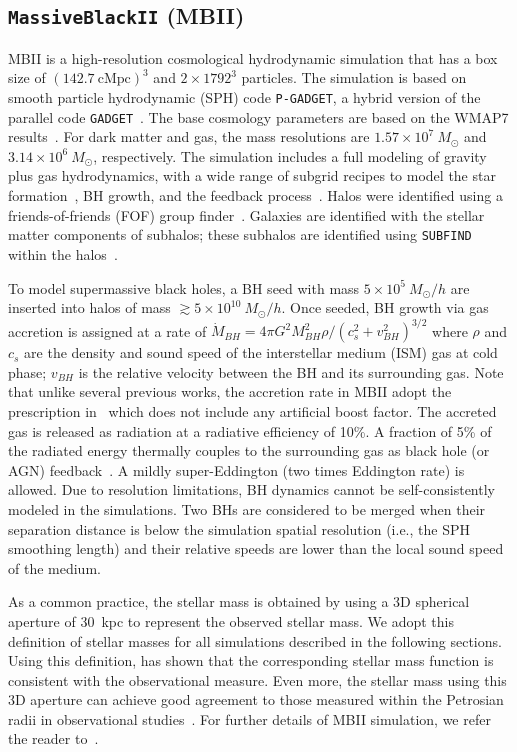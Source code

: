 \documentclass[twocolumn]{aastex631}
\begin{document}
\subsection{{\tt MassiveBlackII} (MBII)}\label{subsec:MBII}
MBII is a high-resolution cosmological hydrodynamic simulation that has a box size of $(142.7~\mathrm{cMpc})^3$
and $2\times1792^3$ particles. The simulation is based on smooth particle hydrodynamic (SPH) code \texttt{P-GADGET}, a hybrid version of the parallel code {\tt GADGET}~\citep{2005MNRAS.364.1105S}. The base cosmology parameters are based on the WMAP7 results~\citep{2011ApJS..192...18K}. For dark matter and gas, the mass resolutions are $1.57\times 10^7~M_{\odot}$ and $3.14\times 10^6~M_{\odot}$, respectively. The simulation includes a full modeling of gravity plus gas hydrodynamics, with a wide range of subgrid recipes to model the star formation~\citep{2003MNRAS.339..289S}, BH growth, and the feedback process~\citep{2005Natur.433..604D}. Halos were identified using a friends-of-friends (FOF) group finder~\citep{1985ApJ...292..371D}. Galaxies are identified with the stellar matter components of subhalos; these subhalos are identified using {\tt SUBFIND} within the halos~\citep{2005MNRAS.364.1105S}.

To model supermassive black holes, a BH seed with mass $5\times 10^{5}~M_{\odot}/h$ are inserted into halos of mass $\gtrsim 5\times 10^{10}~M_{\odot}/h$. Once seeded, BH growth via gas accretion is assigned at a rate of $\dot{M}_{BH}={4\pi G^2 M_{BH}^2 \rho}/{(c_s^2+v_{BH}^2)^{3/2}}$ where $\rho$ and $c_s$ are the density and sound speed of the interstellar medium (ISM) gas at cold phase; $v_{BH}$ is the relative velocity between the BH and its surrounding gas. Note that unlike several previous works, the accretion rate in MBII adopt the prescription in~\citet{Pelupessy2007} which does not include any artificial boost factor. The accreted gas is released as radiation at a radiative efficiency of 10\%. A fraction of 5\% of the radiated energy thermally couples to the surrounding gas as black hole (or AGN) feedback~\citep{2005Natur.433..604D}. A mildly super-Eddington (two times Eddington rate) is allowed. Due to resolution limitations, BH dynamics cannot be self-consistently modeled in the simulations. Two BHs are considered to be merged when their separation distance is below the simulation spatial resolution (i.e., the SPH smoothing length) and their relative speeds are lower than the local sound speed of the medium.

As a common practice, the stellar mass is obtained by using a 3D spherical aperture of 30~kpc to represent the observed stellar mass. We adopt this definition of stellar masses for all simulations described in the following sections. Using this definition, \citet{Pillepich2018} has shown that the corresponding stellar mass function is consistent with the observational measure. Even more, the stellar mass using this 3D aperture can achieve good agreement to those measured within the Petrosian radii in observational studies~\citep{Schaye2015}. For further details of MBII simulation, we refer the reader to~\citet{Khandai2015}.
\end{document}
